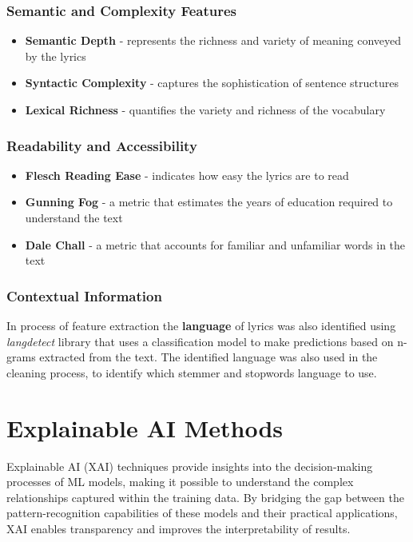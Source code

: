 \subsubsection*{Semantic and Complexity Features}
\begin{itemize}
  \item \textbf{Semantic Depth} - represents the richness and variety of
    meaning conveyed by the lyrics
  \item \textbf{Syntactic Complexity} - captures the sophistication of
    sentence structures
  \item \textbf{Lexical Richness} - quantifies the variety and richness of the
    vocabulary
\end{itemize}



\subsubsection*{Readability and Accessibility}
\begin{itemize}
  \item \textbf{Flesch Reading Ease} - indicates how easy the lyrics are to
    read
  \item \textbf{Gunning Fog} - a metric that estimates the  years of education
    required to understand the text
  \item \textbf{Dale Chall} - a metric that accounts for familiar and
    unfamiliar words in the text
\end{itemize}


\subsubsection*{Contextual Information}
  In process of feature extraction the \textbf{language} of lyrics was also
  identified using \textit{langdetect} library that uses a classification model
  to make predictions based on n-grams extracted from the text. The identified
  language was also used in the cleaning process, to identify which stemmer and
  stopwords language  to use.

\section{Explainable AI Methods}
\label{sec:explainableaimethods}


Explainable AI (XAI) techniques provide insights into the decision-making
processes of ML models, making it possible to understand the complex
relationships captured within the training data. By bridging the gap between
the pattern-recognition capabilities of these models and their practical
applications, XAI enables transparency and improves the interpretability of
results.

